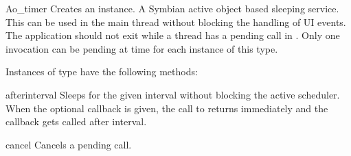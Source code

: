 \begin{classdesc}{Ao_timer}{}
Creates an  instance. A Symbian active object based 
sleeping service. This can be used in the main thread without blocking the 
handling of UI events. The application should not exit while a thread has a 
pending  call in . Only one  
invocation can be pending at time for each instance of this type.
\end{classdesc}

Instances of  type have the following methods:

\begin{methoddesc}[Ao_timer]{after}{interval }
Sleeps for the given interval without blocking the active scheduler. When 
the optional callback is given, the call to  returns 
immediately and the callback gets called after interval.
\end{methoddesc}

\begin{methoddesc}[Ao_timer]{cancel}{}
Cancels a pending  call.
\end{methoddesc}
